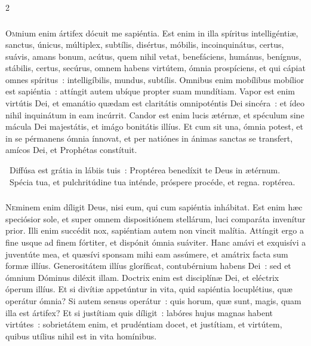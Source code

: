 \documentclass[9pt,twoside]{extarticle}
\begin{document}
\begin{multicols}{2}
{{{\subsubsection*{\center {}}
\lettrine{O}mnium enim ártifex dócuit me sapiéntia. Est enim in illa spíritus intelligéntiæ, sanctus, únicus, múltiplex, subtílis, disértus, móbilis, incoinquinátus, certus, suávis, amans bonum, acútus, quem nihil vetat, benefáciens, humánus, benígnus, stábilis, certus, secúrus, omnem habens virtútem, ómnia prospíciens, et qui cápiat omnes spíritus~: intelligíbilis, mundus, subtílis. Omnibus enim mobílibus mobílior est sapiéntia~: attíngit autem ubíque propter suam mundítiam. Vapor est enim virtútis Dei, et emanátio quædam est claritátis omnipoténtis Dei sincéra~: et ídeo nihil inquinátum in eam incúrrit. Candor est enim lucis ætérnæ, et spéculum sine mácula Dei majestátis, et imágo bonitátis illíus. Et cum sit una, ómnia potest, et in se pérmanens ómnia ínnovat, et per natiónes in ánimas sanctas se transfert, amícos Dei, et Prophétas constítuit.

\begin{tightlist}{}
\item {}~Diffúsa est grátia in lábiis tuis~: \textred{*} Proptérea benedíxit te Deus in ætérnum. ~Spécia tua, et pulchritúdine tua inténde, próspere procéde, et regna. roptérea.
\end{tightlist}

\subsubsection*{\center {}}
\lettrine{N}eminem enim díligit Deus, nisi eum, qui cum sapiéntia inhábitat. Est enim hæc speciósior sole, et super omnem dispositiónem stellárum, luci comparáta invenítur prior. Illi enim succédit nox, sapiéntiam autem non vincit malítia. Attíngit ergo a fine usque ad finem fórtiter, et dispónit ómnia suáviter. Hanc amávi et exquisívi a juventúte mea, et quæsívi sponsam mihi eam assúmere, et amátrix facta sum formæ illíus. Generositátem illíus gloríficat, contubérnium habens Dei~: sed et ómnium Dóminus diléxit illam. Doctrix enim est disciplínæ Dei, et eléctrix óperum illíus. Et si divítiæ appetúntur in vita, quid sapiéntia locuplétius, quæ operátur ómnia? Si autem sensus operátur~: quis horum, quæ sunt, magis, quam illa est ártifex? Et si justítiam quis díligit~: labóres hujus magnas habent virtútes~: sobrietátem enim, et prudéntiam docet, et justítiam, et virtútem, quibus utílius nihil est in vita homínibus.

}}}
\end{multicols}
\end{document}
